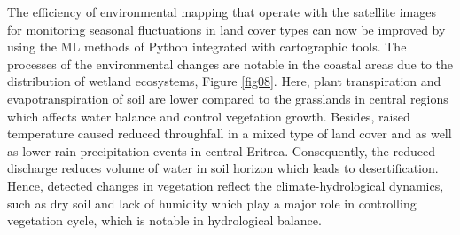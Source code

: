 \documentclass[sn-mathphys-num]{sn-jnl}%
\theoremstyle{thmstyleone}%
\theoremstyle{thmstyletwo}%
\theoremstyle{thmstylethree}%
\begin{document}
The efficiency of environmental mapping that operate with the satellite images for monitoring seasonal fluctuations in land cover types can now be improved by using the ML methods of Python integrated with cartographic tools{. }The processes of the environmental changes are notable in the coastal areas due to the distribution of wetland ecosystems, Figure \ref{fig08}. Here, plant transpiration {and evapotranspiration of soil are} lower compared to the {grasslands} in{ }central regions{ which affects water balance and control vegetation growth. Besides, raised temperature caused reduced throughfall in a mixed type of land cover and as well as lower rain precipitation events in central Eritrea. Consequently, the reduced discharge reduces volume of water in soil horizon which leads to desertification. Hence, detected} changes in vegetation reflect the climate-hydrological dynamics, {such as} dry soil and lack of humidity {which }play a major role in controlling vegetation cycle, which is{ }notable in hydrological balance{.}  
\end{document}

